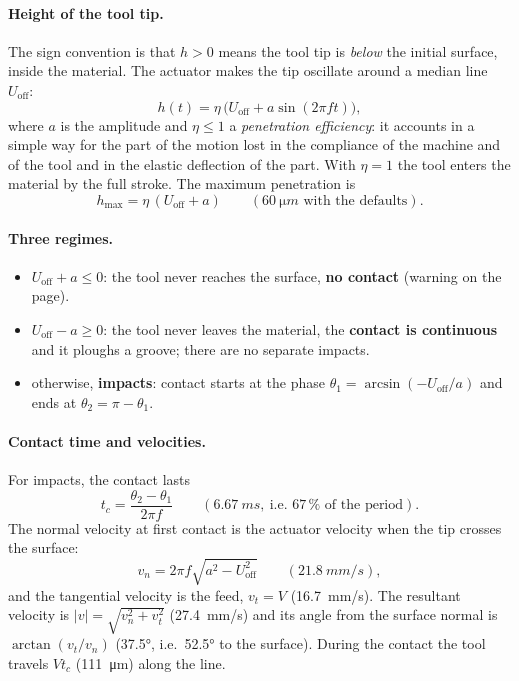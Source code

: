 \documentclass[11pt,a4paper]{article}
\begin{document}
\paragraph{Height of the tool tip.} The sign convention is that $h>0$ means the tool tip is \emph{below} the initial surface, inside the material. The actuator makes the tip oscillate around a median line $U_\mathrm{off}$:
\begin{equation}
h(t)=\eta\,\bigl(U_\mathrm{off}+a\sin(2\pi f t)\bigr),
\end{equation}
where $a$ is the amplitude and $\eta\le1$ a \emph{penetration efficiency}: it accounts in a simple way for the part of the motion lost in the compliance of the machine and of the tool and in the elastic deflection of the part. With $\eta=1$ the tool enters the material by the full stroke. The maximum penetration is
\begin{equation}
h_\mathrm{max}=\eta\,(U_\mathrm{off}+a)\qquad(\SI{60}{\micro m}\text{ with the defaults}).
\end{equation}

\paragraph{Three regimes.}
\begin{itemize}[leftmargin=*]
\item $U_\mathrm{off}+a\le0$: the tool never reaches the surface, \textbf{no contact} (warning on the page).
\item $U_\mathrm{off}-a\ge0$: the tool never leaves the material, the \textbf{contact is continuous} and it ploughs a groove; there are no separate impacts.
\item otherwise, \textbf{impacts}: contact starts at the phase $\theta_1=\arcsin(-U_\mathrm{off}/a)$ and ends at $\theta_2=\pi-\theta_1$.
\end{itemize}

\paragraph{Contact time and velocities.} For impacts, the contact lasts
\begin{equation}
t_c=\frac{\theta_2-\theta_1}{2\pi f}\qquad(\SI{6.67}{ms},\ \text{i.e.\ }67\,\%\text{ of the period}).
\end{equation}
The normal velocity at first contact is the actuator velocity when the tip crosses the surface:
\begin{equation}
v_n=2\pi f\sqrt{a^2-U_\mathrm{off}^2}\qquad(\SI{21.8}{mm/s}),
\end{equation}
and the tangential velocity is the feed, $v_t=V$ (\SI{16.7}{mm/s}). The resultant velocity is $|v|=\sqrt{v_n^2+v_t^2}$ (\SI{27.4}{mm/s}) and its angle from the surface normal is $\arctan(v_t/v_n)$ (37.5°, i.e.\ 52.5° to the surface). During the contact the tool travels $V t_c$ (\SI{111}{\micro m}) along the line.
\end{document}

